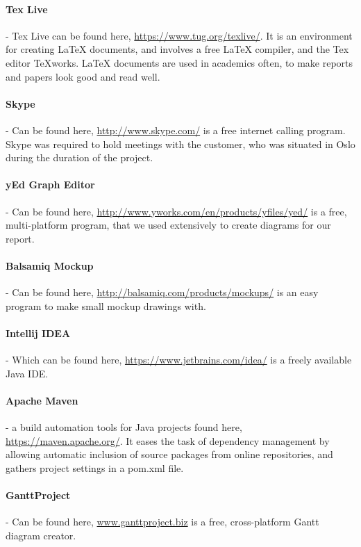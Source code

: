 \documentclass[../document]{subfiles}
\begin{document}
\paragraph{Tex Live} - Tex Live can be found here, \url{https://www.tug.org/texlive/}. It is an environment for creating LaTeX documents, and involves a free LaTeX compiler, and the Tex editor TeXworks. LaTeX documents are used in academics often, to make reports and papers look good and read well.

\paragraph{Skype} - Can be found here, \url{http://www.skype.com/} is a free internet calling program. Skype was required to hold meetings with the customer, who was situated in Oslo during the duration of the project.

\paragraph{yEd Graph Editor} - Can be found here, \url{http://www.yworks.com/en/products/yfiles/yed/} is a free, multi-platform program, that we used extensively to create diagrams for our report.

\paragraph{Balsamiq Mockup} - Can be found here, \url{http://balsamiq.com/products/mockups/} is an easy program to make small mockup drawings with. 

\paragraph{Intellij IDEA} - Which can be found here, \url{https://www.jetbrains.com/idea/} is a freely available \gls{Java} IDE.

\paragraph{Apache Maven} - a build automation tools for \gls{Java} projects found here, \url{https://maven.apache.org/}. It eases the task of dependency management by allowing automatic inclusion of source packages from online repositories, and gathers project settings in a pom.xml file.

\paragraph{GanttProject} - Can be found here, \url{www.ganttproject.biz} is a free, cross-platform Gantt diagram creator.
\end{document}
